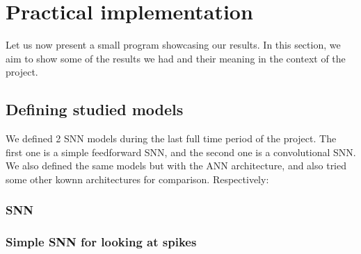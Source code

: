 \documentclass[11pt]{article}
\begin{document}
\pagebreak

\section{Practical implementation}

Let us now present a small program showcasing our results.
In this section, we aim to show some of the results we had and their meaning in the context of the project.

\subsection{Defining studied models}

We defined 2 SNN models during the last full time period of the project. The first one is a simple feedforward SNN, and the second one is a convolutional SNN. We also defined the same models but with the ANN architecture, and also tried some other kownn architectures for comparison. Respectively:

\subsubsection{SNN}

\subsubsection*{Simple SNN for looking at spikes}
\end{document}
